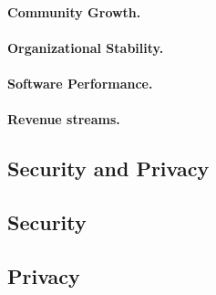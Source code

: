 \documentclass[11pt]{article}
\begin{document}
\paragraph{Community Growth.}
\paragraph{Organizational Stability.}
\paragraph{Software Performance.}
\paragraph{Revenue streams.}

\subsection{Security and Privacy}
\subsection{Security}
\subsection{Privacy}

\newpage
\printbibliography
\end{document}
